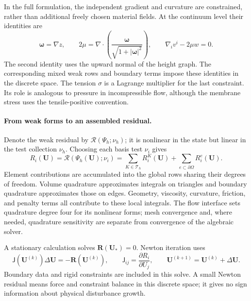 In the full formulation, the independent gradient and curvature are constrained, rather than additional freely chosen material fields. At the continuum level their identities are
\begin{equation}
\bm\omega=\nabla z,\qquad
2\mu=\nabla\cdot\left(\frac{\bm\omega}{\sqrt{1+|\bm\omega|^2}}\right),
\qquad \nabla_i v^i-2\mu w=0.
\end{equation}
The second identity uses the upward normal of the height graph. The corresponding mixed weak rows and boundary terms impose these identities in the discrete space. The tension $\sigma$ is a Lagrange multiplier for the last constraint. Its role is analogous to pressure in incompressible flow, although the membrane stress uses the tensile-positive convention.

\paragraph{From weak forms to an assembled residual.}
Denote the weak residual by $\mathcal R(\Psi_h;\nu_h)$; it is nonlinear in the state but linear in the test collection $\nu_h$. Choosing each basis test $\nu_i$ gives
\begin{equation}
R_i(\bm U)=\mathcal R(\Psi_h(\bm U);\nu_i)
=\sum_{K\in\mathcal T_h}R_i^{K}(\bm U)
+\sum_{e\subset\partial\Omega}R_i^{e}(\bm U).
\label{eq:fem-residual}
\end{equation}
Element contributions are accumulated into the global rows sharing their degrees of freedom. Volume quadrature approximates integrals on triangles and boundary quadrature approximates those on edges. Geometry, viscosity, curvature, friction, and penalty terms all contribute to these local integrals. The flow interface sets quadrature degree four for its nonlinear forms; mesh convergence and, where needed, quadrature sensitivity are separate from convergence of the algebraic solver.

A stationary calculation solves $\bm R(\bm U_*)=0$. Newton iteration uses
\begin{equation}
\mathsf J(\bm U^{(k)})\Delta\bm U=-\bm R(\bm U^{(k)}),
\qquad \mathsf J_{ij}=\frac{\partial R_i}{\partial U_j},
\qquad \bm U^{(k+1)}=\bm U^{(k)}+\Delta\bm U.
\end{equation}
Boundary data and rigid constraints are included in this solve. A small Newton residual means force and constraint balance in this discrete space; it gives no sign information about physical disturbance growth.

